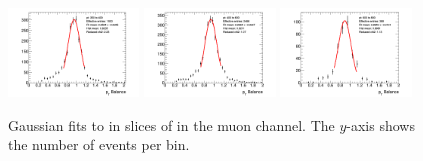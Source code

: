 \begin{figure}[t]
    \includegraphics[width=0.31\textwidth]{plots/insitu/fits_data_zmm_nominal/Zmmjet_Nominal_bin8.png}
    \includegraphics[width=0.31\textwidth]{plots/insitu/fits_data_zmm_nominal/Zmmjet_Nominal_bin9.png}
    \includegraphics[width=0.31\textwidth]{plots/insitu/fits_data_zmm_nominal/Zmmjet_Nominal_bin10.png}
    \caption{Gaussian fits to \ptbal in slices of \ptref in the muon channel. The $y$-axis shows the number of events per bin.\label{fig:insitu:zmmdatafits}}
\end{figure} %

